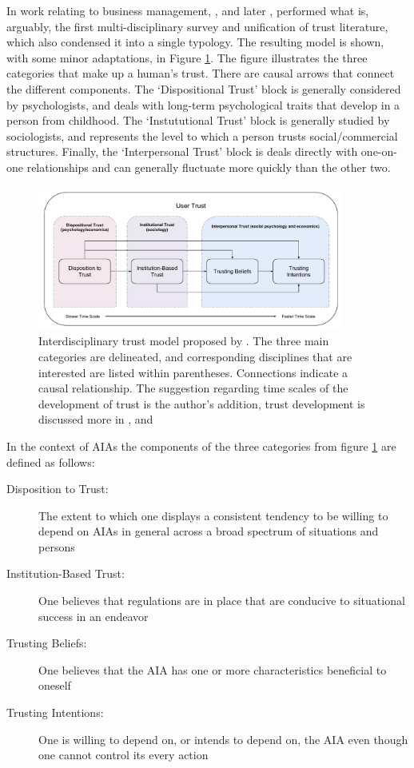         In work relating to business management, \citet{McKnight1998-ty}, and later \citet{McKnight2001-fa}, performed what is, arguably, the first multi-disciplinary survey and unification of trust literature, which also condensed it into a single typology. The resulting model is shown, with some minor adaptations, in Figure \ref{fig:UserTrust}. The figure illustrates the three categories that make up a human's trust. There are causal arrows that connect the different components. The `Dispositional Trust' block is generally considered by psychologists, and deals with long-term psychological traits that develop in a person from childhood. The `Instututional Trust' block is generally studied by sociologists, and represents the level to which a person trusts social/commercial structures. Finally, the `Interpersonal Trust' block is deals directly with one-on-one relationships and can generally fluctuate more quickly than the other two.

        \begin{figure}[htbp]
            \centering
            \includegraphics[width=0.9\textwidth]{Figures/UserTrust}
            \caption{Interdisciplinary trust model proposed by \citet{McKnight2001-fa}. The three main categories are delineated, and corresponding disciplines that are interested are listed within parentheses. Connections indicate a causal relationship. The suggestion regarding time scales of the development of trust is the author's addition, trust development is discussed more in \cite{Lewicki2006-gp}, and \cite{Lewicki2006-hj}}
            \label{fig:UserTrust}
        \end{figure}

        In the context of AIAs the components of the three categories from figure \ref{fig:UserTrust} are defined as follows:

        \begin{description}
            \item [Disposition to Trust:] The extent to which one displays a consistent tendency to be willing to depend on AIAs in general across a broad spectrum of situations and persons
            \item [Institution-Based Trust:] One believes that regulations are in place that are conducive to situational success in an endeavor
            \item [Trusting Beliefs:] One believes that the AIA has one or more characteristics beneficial to oneself
            \item [Trusting Intentions:] One is willing to depend on, or intends to depend on, the AIA even though one cannot control its every action
        \end{description}

